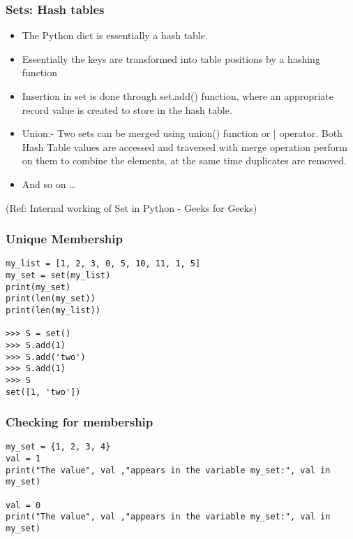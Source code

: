 \begin{frame}[fragile]\frametitle{Sets: Hash tables}
  \begin{itemize}
  \item The Python dict is essentially a hash table. 
  \item Essentially the keys are transformed into table positions by a hashing function
\item Insertion in set is done through set.add() function, where an appropriate record value is created to store in the hash table.
\item Union:- Two sets can be merged using union() function or | operator. Both Hash Table values are accessed and traversed with merge operation perform on them to combine the elements, at the same time duplicates are removed.
\item And so on \ldots

  \end{itemize}

  \tiny{(Ref: Internal working of Set in Python - Geeks for Geeks)}
\end{frame}


\begin{frame}[fragile]\frametitle{Unique Membership} 

\begin{lstlisting}
my_list = [1, 2, 3, 0, 5, 10, 11, 1, 5]
my_set = set(my_list)
print(my_set)
print(len(my_set))
print(len(my_list))

>>> S = set()
>>> S.add(1)
>>> S.add('two')
>>> S.add(1)
>>> S
set([1, 'two'])
\end{lstlisting}

\end{frame}

\begin{frame}[fragile]\frametitle{Checking for membership}
\begin{lstlisting}
my_set = {1, 2, 3, 4}
val = 1
print("The value", val ,"appears in the variable my_set:", val in my_set)

val = 0
print("The value", val ,"appears in the variable my_set:", val in my_set)
\end{lstlisting}

\end{frame}

